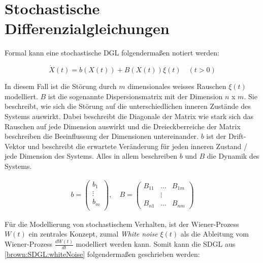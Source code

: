%
%
%
%

\section{Stochastische Differenzialgleichungen\label{brown:SDGL}}

Formal kann eine stochastische DGL folgendermaßen notiert werden: 

\begin{equation}
	\label{brown:SDGL:whiteNoise}
	\dot{X}(t) = b(X(t)) + B(X(t))\xi(t) \quad (t>0)
\end{equation}

In diesem Fall ist die Störung durch $ m $ dimensionales weisses Rauschen $ \xi(t) $ modelliert.
$ B $ ist die sogenannte Dispersionsmatrix mit der Dimension $ n $ x $ m $. Sie beschreibt, wie sich die Störung auf die unterschiedlichen inneren Zustände des Systems auswirkt. Dabei beschreibt die Diagonale der Matrix wie stark sich das Rauschen auf jede Dimension auswirkt und die Dreieckberreiche der Matrix beschreiben die Beeinflussung der Dimensionen untereinander.
$ b $ ist der Drift-Vektor und beschreibt die erwartete Veränderung für jeden inneren Zustand / jede Dimension des Systems.
Alles in allem beschreiben $ b $ und $ B $ die Dynamik des Systems. 

\begin{align*}
	b = 
	\begin{pmatrix}
		b_{1} \\
		\vdots \\
		b_{m}\\ 
	\end{pmatrix}
	, \quad
	B = 
	\begin{pmatrix}
		B_{11} & \dots & B_{1m} \\
		& \vdots & \\
		B_{n1} & \dots & B_{nm} 
	\end{pmatrix}
\end{align*}


Für die Modellierung von stochastischem Verhalten, ist der Wiener-Prozess $ W(t) $ ein zentrales Konzept, zumal \textit{White noise} $ \xi(t) $ als die Ableitung vom Wiener-Prozess $ \frac{dW(t)}{dt} $ modelliert werden kann. Somit kann die SDGL aus \ref{brown:SDGL:whiteNoise} folgendermaßen geschrieben werden:

